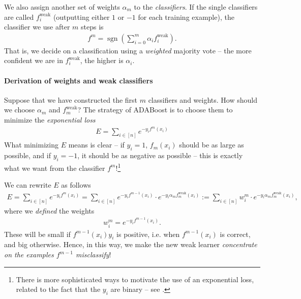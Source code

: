 \documentclass{article}
\DeclareMathOperator{\sgn}{sgn}
\newcommand{\weak}{\mathrm{weak}}
\begin{document}
We also assign another set of weights $\alpha_m$ to the \emph{classifiers}. If the single classifiers are called $f_i^\weak$ (outputting either $1$ or $-1$ for each training example), the  classifier we use after $m$ steps is
\begin{align*}
    f^m = \sgn\left(\sum_{i=0}^m \alpha_i f_i^\weak\right).
\end{align*}
That is, we decide on a classification using a \emph{weighted} majority vote -- the more confident we are in $f_i^\weak$, the higher is $\alpha_i$.

\paragraph{Derivation of weights and weak classifiers} Suppose that we have constructed the first $m$ classifiers and weights. How should we choose $\alpha_m$ and $f_m^\weak$? The strategy of ADABoost is to choose them to minimize the \emph{exponential loss}
\begin{align} \label{eq:err}
    E = \sum_{i\in[n]} e^{-y_if^m(x_i)}
\end{align}
What minimizing $E$ means is clear -- if $y_i=1$, $f_m(x_i)$ should be as large as possible, and if $y_i=-1$, it should be as negative as possible -- this is exactly what we want from the classifier $f^m$!\footnote{There is  more sophisticated ways to motivate the use of an exponential loss, related to the fact that the $y_i$ are binary  -- see \cite[Chapter 10]{hastie2009elements}.} \newline

We can rewrite $E$ as follows
\begin{align*}
     E= \sum_{i\in[n]} e^{-y_if^m(x_i)} = \sum_{i\in [n]}e^{-y_if^{m-1}(x_i)} \cdot e^{-y_i\alpha_m f_m^{\weak}(x_i)}:= \sum_{i\in [n]}w_i^m \cdot e^{-y_i\alpha_m f_m^{\weak}(x_i)},
\end{align*}
where we \emph{defined} the weights
\begin{align} \label{eq:weights}
    w_i^m = e^{-y_if^{m-1}(x_i)}.
\end{align}
These will be small if $f^{m-1}(x_i)y_i$ is positive, i.e. when $f^{m-1}(x_i)$ is correct, and big otherwise. Hence, in this way, we make the new weak learner \emph{concentrate on the examples $f^{m-1}$ misclassify}!
\end{document}
